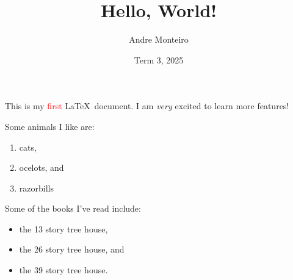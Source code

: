 \documentclass[12pt]{article}
\title{Hello, World!}
\author{Andre Monteiro}
\date{Term 3, 2025}
\begin{document}
\maketitle
This is my \textcolor{red}{first} \LaTeX\ document. I am \emph{very} excited to learn more features!

Some animals I like are:
\begin{enumerate}
    \item cats,
    \item ocelots, and
    \item razorbills
\end{enumerate}

Some of the books I've read include:
\begin{itemize}
    \item the 13 story tree house,
    \item the 26 story tree house, and
    \item the 39 story tree house.
\end{itemize}
\end{document}
